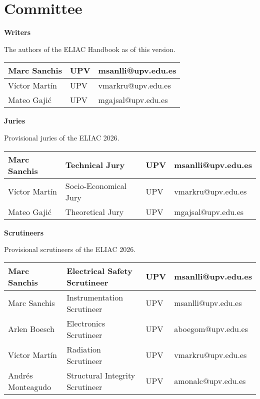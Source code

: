 \section*{Committee}

\textbf{Writers}

\noindent The authors of the ELIAC Handbook as of this version.
\begin{center}
    \begin{tabular}{lll}
        Marc Sanchis & UPV & msanlli@upv.edu.es \\ \midrule
        Víctor Martín & UPV & vmarkru@upv.edu.es \\ \midrule
        Mateo Gajić & UPV & mgajsal@upv.edu.es
    \end{tabular}
\end{center}

\noindent \textbf{Juries}

\noindent Provisional juries of the ELIAC 2026.
\begin{center}
    \begin{tabular}{llll}
        Marc Sanchis & Technical Jury & UPV & msanlli@upv.edu.es \\ \midrule
        Víctor Martín & Socio-Economical Jury & UPV & vmarkru@upv.edu.es \\ \midrule
        Mateo Gajić & Theoretical Jury & UPV & mgajsal@upv.edu.es
    \end{tabular}
\end{center}

\noindent \textbf{Scrutineers}

\noindent Provisional scrutineers of the ELIAC 2026.
\begin{center}
    \begin{tabular}{llll}
        Marc Sanchis & Electrical Safety Scrutineer & UPV & msanlli@upv.edu.es \\ \midrule
        Marc Sanchis & Instrumentation Scrutineer & UPV & msanlli@upv.edu.es \\ \midrule
        Arlen Boesch & Electronics Scrutineer & UPV & aboegom@upv.edu.es \\ \midrule
        Víctor Martín & Radiation Scrutineer & UPV & vmarkru@upv.edu.es \\ \midrule
        Andrés Monteagudo & Structural Integrity Scrutineer & UPV & amonalc@upv.edu.es
    \end{tabular}
\end{center}
